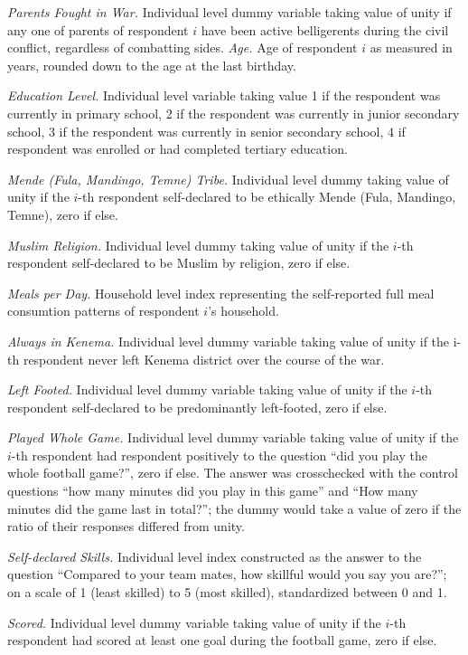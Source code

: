 \textit{Parents Fought in War.} Individual level dummy variable taking value of unity if any one of parents of respondent $i$ have been active belligerents during the civil conflict, regardless of combatting sides.
\textit{Age.} Age of respondent $i$ as measured in years, rounded down to the age at the last birthday.

\textit{Education Level.} Individual level variable taking value 1 if the respondent was currently in primary school, 2 if the respondent was currently in junior secondary school, 3 if the respondent was currently in senior secondary school, 4 if respondent was enrolled or had completed tertiary education.

\textit{Mende (Fula, Mandingo, Temne) Tribe.} Individual level dummy taking value of unity if the $i$-th respondent self-declared to be ethically Mende (Fula, Mandingo, Temne), zero if else.


\textit{Muslim Religion.} Individual level dummy taking value of unity if the $i$-th respondent self-declared to be Muslim by religion, zero if else.

\textit{Meals per Day.} Household level index representing the self-reported full meal consumtion patterns of respondent $i$’s household.

\textit{Always in Kenema.} Individual level dummy variable taking value of unity if the i-th respondent never left Kenema district over the course of the war.

\textit{Left Footed.} Individual level dummy variable taking value of unity if the $i$-th respondent self-declared to be predominantly left-footed, zero if else.

\textit{Played Whole Game.} Individual level dummy variable taking value of unity if the $i$-th respondent had respondent positively to the question ``did you play the whole football game?'', zero if else. The answer was crosschecked with the control questions ``how many minutes did you play in this game'' and ``How many minutes did the game last in total?''; the dummy would take a value of zero if the ratio of their responses differed from unity.

\textit{Self-declared Skills.} Individual level index constructed as the answer to the question ``Compared to your team mates, how skillful would you say you are?''; on a scale of 1 (least skilled) to 5 (most skilled), standardized between 0 and 1. 

\textit{Scored.} Individual level dummy variable taking value of unity if the $i$-th respondent had scored at least one goal during the football game, zero if else.

